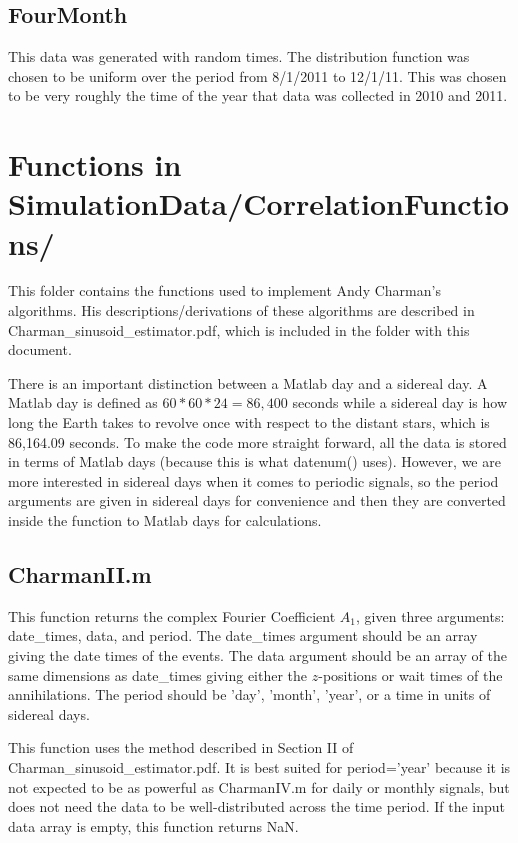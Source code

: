 \documentclass[12pt]{report}
\begin{document}
\section{FourMonth}
This data was generated with random times.  The distribution function was chosen to be uniform over the period from 8/1/2011 to 12/1/11.  This was chosen to be very roughly the time of the year that data was collected in 2010 and 2011.





\chapter{Functions in SimulationData/CorrelationFunctions/}
This folder contains the functions used to implement Andy Charman's algorithms.  His descriptions/derivations of these algorithms are described in Charman\_sinusoid\_estimator.pdf, which is included in the folder with this document.

There is an important distinction between a Matlab day and a sidereal day.  A Matlab day is defined as $60*60*24=86,400$ seconds while a sidereal day is how long the Earth takes to revolve once with respect to the distant stars, which is 86,164.09 seconds.  To make the code more straight forward, all the data is stored in terms of Matlab days (because this is what datenum() uses).  However, we are more interested in sidereal days when it comes to periodic signals, so the period arguments are given in sidereal days for convenience and then they are converted inside the function to Matlab days for calculations.

\section{CharmanII.m}
This function returns the complex Fourier Coefficient $A_1$, given three arguments: date\_times, data, and period.  The date\_times argument should be an array giving the date times of the events.  The data argument should be an array of the same dimensions as date\_times giving either the $z$-positions or wait times of the annihilations.  The period should be 'day', 'month', 'year', or a time in units of sidereal days.

This function uses the method described in Section II of Charman\_sinusoid\_estimator.pdf.  It  is best suited for period='year' because it is not expected to be as powerful as CharmanIV.m for daily or monthly signals, but does not need the data to be well-distributed across the time period.  If the input data array is empty, this function returns NaN.
\end{document}
